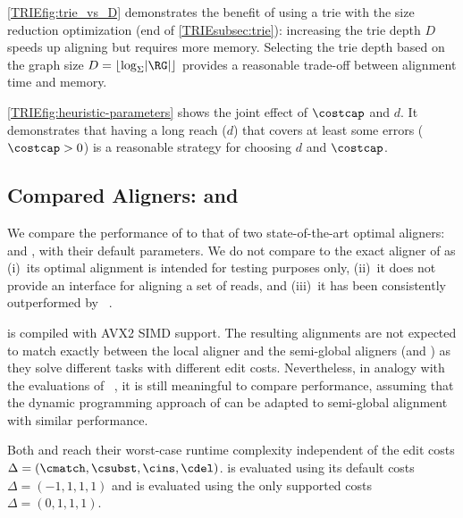 \cref{TRIEfig:trie_vs_D} demonstrates the benefit of using a trie with the size
reduction optimization (end of \cref{TRIEsubsec:trie}): increasing the trie depth
$D$ speeds up aligning but requires more memory. Selecting the trie depth based
on the graph size \mbox{$D = \lfloor \log_\Sigma \lvert \RG \rvert \rfloor$}
provides a reasonable trade-off between alignment time and memory.

\cref{TRIEfig:heuristic-parameters} shows the joint effect of $\costcap$ and $d$. It
demonstrates that having a long reach ($d$) that covers at least some errors
($\costcap > 0$) is a reasonable strategy for choosing $d$ and $\costcap$.

\subsection{Compared Aligners: \pasgal and \bitparallel}

We compare the performance of \astarix to that of two state-of-the-art optimal
aligners: \pasgal and \bitparallel, with their default parameters.
%
We do not compare to the exact aligner of \vg as (i)~its optimal alignment
is intended for testing purposes only, (ii)~it does not provide an
interface for aligning a set of reads, and (iii)~it has been consistently
outperformed by \pasgal~\cite{jain_accelerating_2019}.

\pasgal is compiled with AVX2 SIMD support. The resulting alignments are not
expected to match exactly between the local aligner \pasgal and the semi-global
aligners (\astarix and \bitparallel) as they solve different tasks with
different edit costs. Nevertheless, in analogy with the evaluations of
\pasgal~\cite{jain_accelerating_2019}, it is still meaningful to compare
performance, assuming that the dynamic programming approach of \pasgal can be
adapted to semi-global alignment with similar performance.

Both \bitparallel and \pasgal reach their worst-case runtime complexity
independent of the edit costs $\Delta=(\cmatch,\csubst,\cins,\cdel)$. \pasgal is
evaluated using its default costs ~$\Delta=(-1,1,1,1)$ and \bitparallel is
evaluated using the only supported costs~$\Delta=(0,1,1,1)$.
